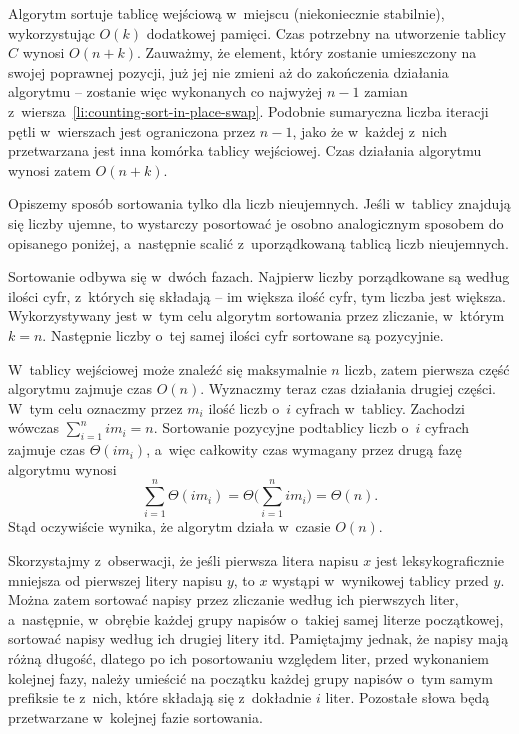 Algorytm sortuje tablicę wejściową w~miejscu (niekoniecznie stabilnie), wykorzystując $O(k)$ dodatkowej pamięci. Czas potrzebny na utworzenie tablicy $C$ wynosi $O(n+k)$. Zauważmy, że element, który zostanie umieszczony na swojej poprawnej pozycji, już jej nie zmieni aż do zakończenia działania algorytmu -- zostanie więc wykonanych co najwyżej $n-1$ zamian z~wiersza~\ref{li:counting-sort-in-place-swap}. Podobnie sumaryczna liczba iteracji pętli  w~wierszach \twodashes{\ref{li:counting-sort-in-place-while1-begin}}{\ref{li:counting-sort-in-place-while1-end}} jest ograniczona przez $n-1$, jako że w~każdej z~nich przetwarzana jest inna komórka tablicy wejściowej. Czas działania algorytmu wynosi zatem $O(n+k)$.


\subproblem %
Opiszemy sposób sortowania tylko dla liczb nieujemnych. Jeśli w~tablicy znajdują się liczby ujemne, to wystarczy posortować je osobno analogicznym sposobem do opisanego poniżej, a~następnie scalić z~uporządkowaną tablicą liczb nieujemnych.

Sortowanie odbywa się w~dwóch fazach. Najpierw liczby porządkowane są według ilości cyfr, z~których się składają -- im większa ilość cyfr, tym liczba jest większa. Wykorzystywany jest w~tym celu algorytm sortowania przez zliczanie, w~którym $k=n$. Następnie liczby o~tej samej ilości cyfr sortowane są pozycyjnie.

W~tablicy wejściowej może znaleźć się maksymalnie $n$ liczb, zatem pierwsza część algorytmu zajmuje czas $O(n)$. Wyznaczmy teraz czas działania drugiej części. W~tym celu oznaczmy przez $m_i$ ilość liczb o~$i$ cyfrach w~tablicy. Zachodzi wówczas $\sum_{i=1}^nim_i=n$. Sortowanie pozycyjne podtablicy liczb o~$i$ cyfrach zajmuje czas $\Theta(im_i)$, a~więc całkowity czas wymagany przez drugą fazę algorytmu wynosi
\[
    \sum_{i=1}^n\Theta(im_i) = \Theta\biggl(\sum_{i=1}^nim_i\biggr) = \Theta(n).
\]
Stąd oczywiście wynika, że algorytm działa w~czasie $O(n)$.

\subproblem %
Skorzystajmy z~obserwacji, że jeśli pierwsza litera napisu $x$ jest leksykograficznie mniejsza od pierwszej litery napisu $y$, to $x$ wystąpi w~wynikowej tablicy przed $y$. Można zatem sortować napisy przez zliczanie według ich pierwszych liter, a~następnie, w~obrębie każdej grupy napisów o~takiej samej literze początkowej, sortować napisy według ich drugiej litery itd. Pamiętajmy jednak, że napisy mają różną długość, dlatego po ich posortowaniu względem  liter, przed wykonaniem kolejnej fazy, należy umieścić na początku każdej grupy napisów o~tym samym prefiksie  te z~nich, które składają się z~dokładnie $i$ liter. Pozostałe słowa będą przetwarzane w~kolejnej fazie sortowania.

